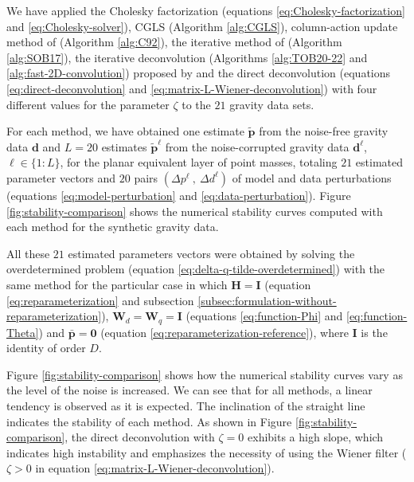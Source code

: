 \documentclass[utf8]{FrontiersinHarvard} %
\begin{document}
	We have applied the Cholesky factorization (equations \ref{eq:Cholesky-factorization} and \ref{eq:Cholesky-solver}), 
	CGLS (Algorithm \ref{alg:CGLS}), column-action update method of \citet{cordell1992} (Algorithm \ref{alg:C92}), 
	the iterative method of \citet{siqueira-etal2017} (Algorithm \ref{alg:SOB17}), 
	the iterative deconvolution (Algorithms \ref{alg:TOB20-22} and \ref{alg:fast-2D-convolution}) proposed by 
	\citet{takahashi-etal2020} and the direct deconvolution 
	(equations \ref{eq:direct-deconvolution} and \ref{eq:matrix-L-Wiener-deconvolution})
	with four different values for the parameter $\zeta$ to the $21$ gravity data sets.
	
	For each method, we have obtained one estimate $\tilde{\mathbf{p}}$ from the noise-free gravity data $\mathbf{d}$
	and $L=20$ estimates $\tilde{\mathbf{p}}^{\ell}$ from the noise-corrupted gravity data $\mathbf{d}^{\ell}$, $\ell \in \{1:L\}$,
	for the planar equivalent layer of point masses, totaling $21$ estimated parameter vectors and 
	$20$ pairs $\left( \Delta p^{\ell} \: , \: \Delta d^{\ell} \right)$ of model and data perturbations
	(equations \ref{eq:model-perturbation} and \ref{eq:data-perturbation}).
	Figure \ref{fig:stability-comparison} shows the numerical stability curves computed with each method for 
	the synthetic gravity data.
	
	All these $21$ estimated parameters vectors were obtained by solving 
	the overdetermined problem (equation \ref{eq:delta-q-tilde-overdetermined}) with the same method for the particular case in which
	$\mathbf{H} = \mathbf{I}$ (equation \ref{eq:reparameterization} and 
	subsection \ref{subsec:formulation-without-reparameterization}),
	$\mathbf{W}_{d} = \mathbf{W}_{q} = \mathbf{I}$ (equations \ref{eq:function-Phi} and \ref{eq:function-Theta}) and
	$\bar{\mathbf{p}} = \mathbf{0}$ (equation \ref{eq:reparameterization-reference}), where $\mathbf{I}$ is the identity of order $D$.
	
	Figure \ref{fig:stability-comparison} shows how the numerical stability curves vary as the level of the noise is increased. 
	We can see that for all methods, a linear tendency is observed as it is expected. The inclination of the straight line indicates the stability of each method. 
	As shown in Figure \ref{fig:stability-comparison}, the direct deconvolution with $\zeta = 0$ exhibits a high slope, which indicates high instability and 
	emphasizes the necessity of using the Wiener filter ($\zeta > 0$ in equation \ref{eq:matrix-L-Wiener-deconvolution}). 
	
\end{document}
